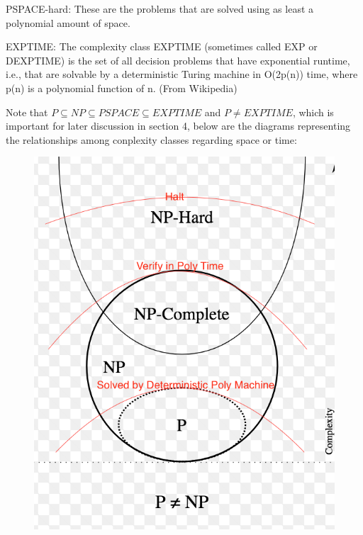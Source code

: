 \documentclass{article}
\begin{document}
\par PSPACE-hard: These are the problems that are solved using as least a polynomial amount of space.
\par EXPTIME: The complexity class EXPTIME (sometimes called EXP or DEXPTIME) is the set of all decision problems that have exponential runtime, i.e., that are solvable by a deterministic Turing machine in O(2p(n)) time, where p(n) is a polynomial function of n. (From Wikipedia) \\
\par Note that $P \subseteq NP \subseteq PSPACE \subseteq EXPTIME$ and $P \neq EXPTIME$, which is important for later discussion in section 4, below are the diagrams representing the relationships among conplexity classes regarding space or time: \\
\begin{figure}[h]
    \includegraphics[scale=0.5]{NP.png}

\end{figure}
\end{document}
